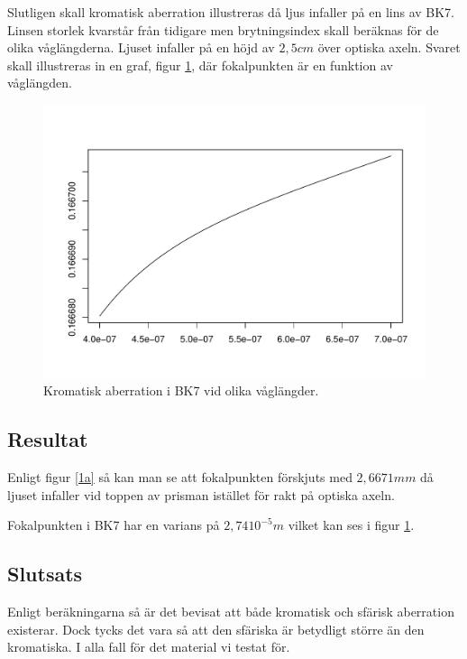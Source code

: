 \documentclass[12pt]{article}
\begin{document}
Slutligen skall kromatisk aberration illustreras då ljus infaller på en lins av BK7. Linsen storlek kvarstår från tidigare men brytningsindex skall beräknas för de olika våglängderna. Ljuset infaller på en höjd av $2,5 cm$ över optiska axeln. Svaret skall illustreras in en graf, figur \ref{1c}, där fokalpunkten är en funktion av våglängden.

\begin{figure}[h!]
  \centering
   \includegraphics[scale=0.6]{BK7_abo.pdf}
	\caption{Kromatisk aberration i BK7 vid olika våglängder.}
	\label{1c}
\end{figure} 

\subsection{Resultat}
Enligt figur \ref{1a} så kan man se att fokalpunkten förskjuts med $2,6671 mm$ då ljuset infaller vid toppen av prisman istället för rakt på optiska axeln.

\noindent
Fokalpunkten i BK7 har en varians på $2,74 10^{-5}m$ vilket kan ses i figur \ref{1c}.



\subsection{Slutsats}
Enligt beräkningarna så är det bevisat att både kromatisk och sfärisk aberration existerar. Dock tycks det vara så att den sfäriska är betydligt större än den kromatiska. I alla fall för det material vi testat för.
\end{document}
